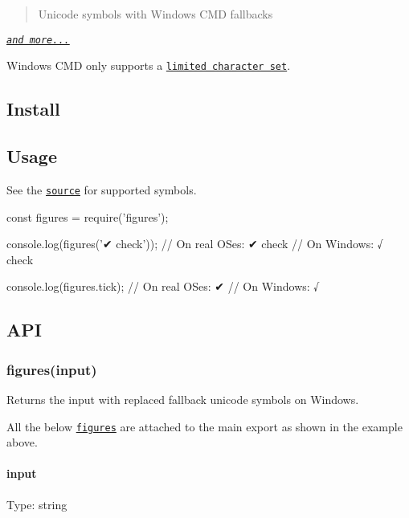 \begin{quote}
Unicode symbols with Windows C\+MD fallbacks \end{quote}


\href{index.js}{\tt }

\href{index.js}{\tt {\itshape and more...}}

Windows C\+MD only supports a \href{http://en.wikipedia.org/wiki/Code_page_437}{\tt limited character set}.

\subsection*{Install}




\subsection*{Usage}

See the \href{index.js}{\tt source} for supported symbols.


\begin{DoxyCode}
const figures = require('figures');

console.log(figures('✔︎ check'));
// On real OSes:  ✔︎ check
// On Windows:    √ check

console.log(figures.tick);
// On real OSes:  ✔︎
// On Windows:    √
\end{DoxyCode}


\subsection*{A\+PI}

\subsubsection*{figures(input)}

Returns the input with replaced fallback unicode symbols on Windows.

All the below \href{#figures}{\tt figures} are attached to the main export as shown in the example above.

\paragraph*{input}

Type\+: {\ttfamily string}

